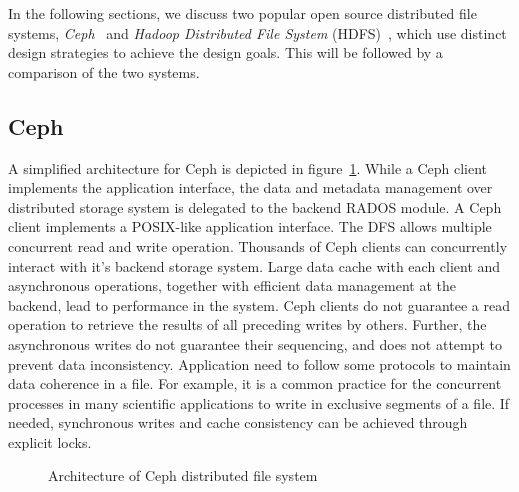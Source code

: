  
In the following sections, we discuss two popular open source distributed file systems, {\em Ceph}~\citep{Weil:2006} and {\em 
Hadoop Distributed File System} (HDFS)~\citep{Shvachko:2010}, which use distinct design strategies to achieve the design goals. 
This will be followed by a comparison of the two systems.

\subsection{Ceph}

A simplified architecture for Ceph is depicted in figure~\ref{fig:bigdata:ceph}. While a Ceph client implements the application
interface, the data and metadata management over distributed storage system is delegated to the backend RADOS module.
%
A Ceph client implements a POSIX-like application interface. The DFS allows multiple concurrent read and write operation. Thousands 
of Ceph clients can concurrently interact with it's backend storage system. Large data cache with each client and asynchronous 
operations, together with efficient data management at the backend,  lead to performance in the system. Ceph clients do not guarantee 
a read operation to retrieve the results of all preceding writes by others. Further, the asynchronous writes do not guarantee their 
sequencing, and does not attempt to prevent data inconsistency. Application need to follow some protocols to maintain data coherence 
in a file. For example, it is a common practice for the concurrent processes in many scientific applications to write in exclusive 
segments of a file. If needed, synchronous writes and cache consistency can be achieved through explicit locks.

\begin{figure}[htbp!]
	\centerline{
	}
	\caption{Architecture of Ceph distributed file system} 
	\label{fig:bigdata:ceph}
\end{figure}

